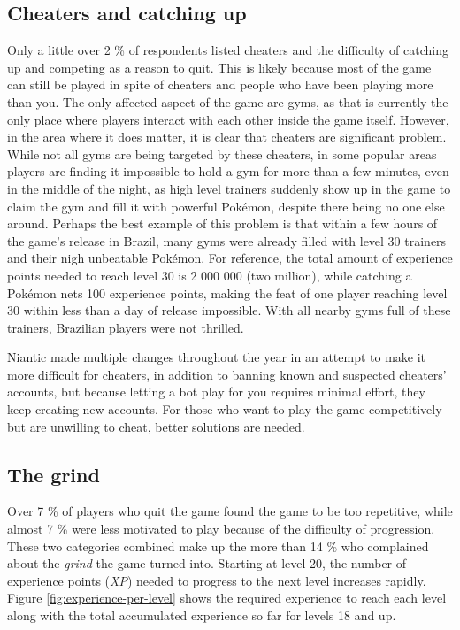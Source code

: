 \subsection{Cheaters and catching up}
\label{sec:cheaters-analysis}
Only a little over 2 \% of respondents listed cheaters and the difficulty of catching up and competing as a reason to quit. This is likely because most of the game can still be played in spite of cheaters and people who have been playing more than you. The only affected aspect of the game are gyms, as that is currently the only place where players interact with each other inside the game itself. However, in the area where it does matter, it is clear that cheaters are significant problem. While not all gyms are being targeted by these cheaters, in some popular areas players are finding it impossible to hold a gym for more than a few minutes, even in the middle of the night, as high level trainers suddenly show up in the game to claim the gym and fill it with powerful Pokémon, despite there being no one else around. Perhaps the best example of this problem is that within a few hours of the game's release in Brazil, many gyms were already filled with level 30 trainers and their nigh unbeatable Pokémon. For reference, the total amount of experience points needed to reach level 30 is 2 000 000 (two million), while catching a Pokémon nets 100 experience points, making the feat of one player reaching level 30 within less than a day of release impossible. With all nearby gyms full of these trainers, Brazilian players were not thrilled.

Niantic made multiple changes throughout the year in an attempt to make it more difficult for cheaters, in addition to banning known and suspected cheaters' accounts, but because letting a bot play for you requires minimal effort, they keep creating new accounts. For those who want to play the game competitively but are unwilling to cheat, better solutions are needed. 

\subsection{The grind}
\label{sec:quitting-reasons-the-grind}
Over 7 \% of players who quit the game found the game to be too repetitive, while almost 7 \% were less motivated to play because of the difficulty of progression. These two categories combined make up the more than 14 \% who complained about the \emph{grind}  the game turned into. Starting at level 20, the number of experience points (\emph{XP}) needed to progress to the next level increases rapidly. Figure \ref{fig:experience-per-level} shows the required experience to reach each level along with the total accumulated experience so far for levels 18 and up.

